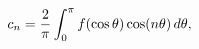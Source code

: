 \[c_{n}=\frac{2}{\pi}\int_{0}^{\pi}f(\mathop{\cos\/}\nolimits\theta)\mathop{\cos%
\/}\nolimits\!\left(n\theta\right)d\theta,\]